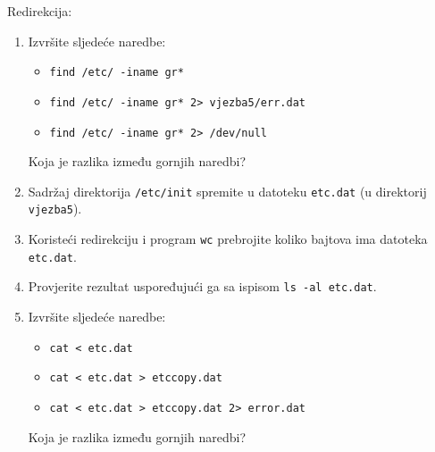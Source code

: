 \begin{zadatak} Redirekcija: 
\begin{enumerate}
\item 
Izvršite sljedeće naredbe:
\begin{itemize}
 \item \lstinline!find /etc/ -iname gr*!
\item \lstinline!find /etc/ -iname gr* 2> vjezba5/err.dat!
\item \lstinline!find /etc/ -iname gr* 2> /dev/null!
\end{itemize}             
Koja je razlika između gornjih naredbi?
\item Sadržaj direktorija \lstinline!/etc/init! spremite u datoteku \lstinline!etc.dat! (u direktorij \lstinline!vjezba5!).
\item Koristeći redirekciju i program \lstinline!wc! prebrojite koliko bajtova ima datoteka \lstinline!etc.dat!.
\item Provjerite rezultat uspoređujući ga sa ispisom \lstinline!ls -al etc.dat!.
\item Izvršite sljedeće naredbe:
\begin{itemize}
 \item \lstinline!cat < etc.dat!
\item \lstinline!cat < etc.dat > etccopy.dat!
\item \lstinline!cat < etc.dat > etccopy.dat 2> error.dat!
\end{itemize}
Koja je razlika između gornjih naredbi?
\end{enumerate}
\end{zadatak}

